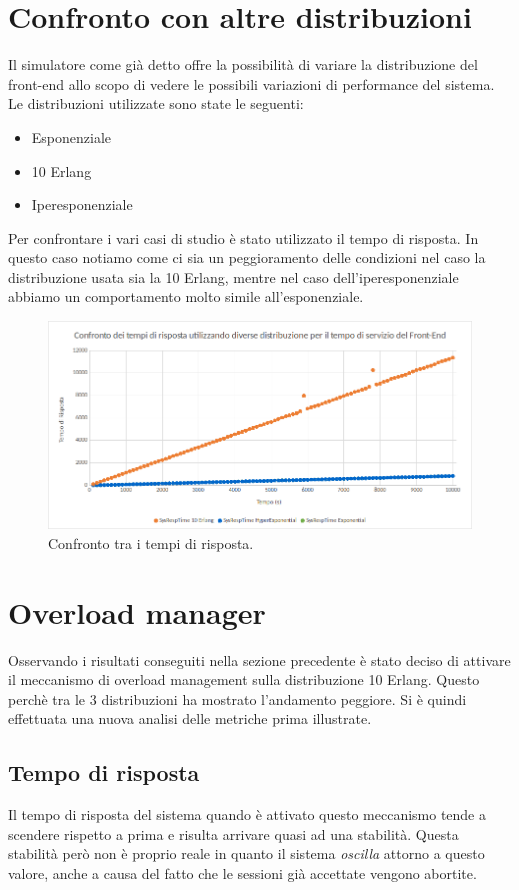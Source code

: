  \section{Confronto con altre distribuzioni}
 Il simulatore come già detto offre la possibilità di variare la distribuzione del front-end allo scopo di vedere le possibili variazioni di performance del sistema.
 Le distribuzioni utilizzate sono state le seguenti:
 \begin{itemize}
  \item Esponenziale
  \item 10 Erlang
  \item Iperesponenziale
 \end{itemize}
Per confrontare i vari casi di studio è stato utilizzato il tempo di risposta. In questo caso notiamo come ci sia un peggioramento delle condizioni nel caso la distribuzione usata sia la 10 Erlang, mentre nel caso dell'iperesponenziale abbiamo un comportamento molto simile all'esponenziale.
\begin{figure}[H]
	\begin{center}
	\includegraphics[scale=0.5]{img/confr_distrib.png}
	\caption[Confronto tra i tempi di risposta]{Confronto tra i tempi di risposta.}
	\label{fig:confr_distrib}
	\end{center}
\end{figure}

\section{Overload manager}
Osservando i risultati conseguiti nella sezione precedente è stato deciso di attivare il meccanismo di overload management sulla distribuzione 10 Erlang. Questo perchè tra le 3 distribuzioni ha mostrato l'andamento peggiore. Si è quindi effettuata una nuova analisi delle metriche prima illustrate.

\subsection{Tempo di risposta}
Il tempo di risposta del sistema quando è attivato questo meccanismo tende a scendere rispetto a prima e risulta arrivare quasi ad una stabilità. Questa stabilità però non è proprio reale in quanto il sistema \textit{oscilla} attorno a questo valore, anche a causa del fatto che le sessioni già accettate vengono abortite.

